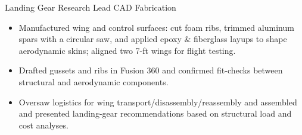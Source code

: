 Landing Gear Research Lead \textbar{} CAD \textbar{} Fabrication
\begin{itemize}
  \item Manufactured wing and control surfaces: cut foam ribs, trimmed aluminum spars with a circular saw, and applied epoxy \& fiberglass layups to shape aerodynamic skins; aligned two 7-ft wings for flight testing.
  \item Drafted gussets and ribs in Fusion 360 and confirmed fit-checks between structural and aerodynamic components.
  \item Oversaw logistics for wing transport/disassembly/reassembly and assembled and presented landing-gear recommendations based on structural load and cost analyses.
\end{itemize}


